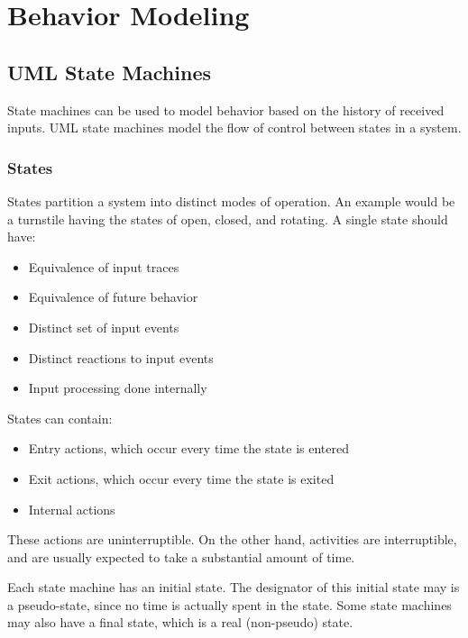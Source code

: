 \documentclass[12pt,titlepage]{article}
\let\stdsection\section
\renewcommand\section{\clearpage\stdsection}
\begin{document}
  \section{Behavior Modeling}

    \subsection{UML State Machines}
      State machines can be used to model behavior based on the history of received inputs. UML state machines model the flow of control between
      states in a system.

      \subsubsection{States}
        States partition a system into distinct modes of operation. An example would be a turnstile having the states of open, closed, and rotating.
        A single state should have:
        \begin{itemize}
          \item Equivalence of input traces
          \item Equivalence of future behavior
          \item Distinct set of input events
          \item Distinct reactions to input events
          \item Input processing done internally
        \end{itemize}

        States can contain:
        \begin{itemize}
          \item Entry actions, which occur every time the state is entered
          \item Exit actions, which occur every time the state is exited
          \item Internal actions
        \end{itemize}

        These actions are uninterruptible. On the other hand, activities are interruptible, and are usually expected to take a substantial amount of time.

        Each state machine has an initial state. The designator of this initial state may is a pseudo-state, since no time is actually spent in the state.
        Some state machines may also have a final state, which is a real (non-pseudo) state.
\end{document}
